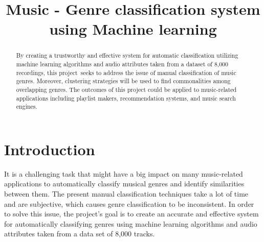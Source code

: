 \documentclass[conference]{IEEEtran}
\begin{document}
\title{Music - Genre classification system using Machine learning}

\author{
\and
{}
\and
{}
}

\maketitle


\begin{abstract}
By creating a trustworthy and effective system for automatic classification utilizing machine learning algorithms and audio attributes taken from a dataset of 8,000 recordings, this project seeks to address the issue of manual classification of music genres. Moreover, clustering strategies will be used to find commonalities among overlapping genres. The outcomes of this project could be applied to music-related applications including playlist makers, recommendation systems, and music search engines.
\end{abstract}

\section{Introduction}
It is a challenging task that might have a big impact on many music-related applications to automatically classify musical genres and identify similarities between them. The present manual classification techniques take a lot of time and are subjective, which causes genre classification to be inconsistent. In order to solve this issue, the project's goal is to create an accurate and effective system for automatically classifying genres using machine learning algorithms and audio attributes taken from a data set of 8,000 tracks.
\end{document}

